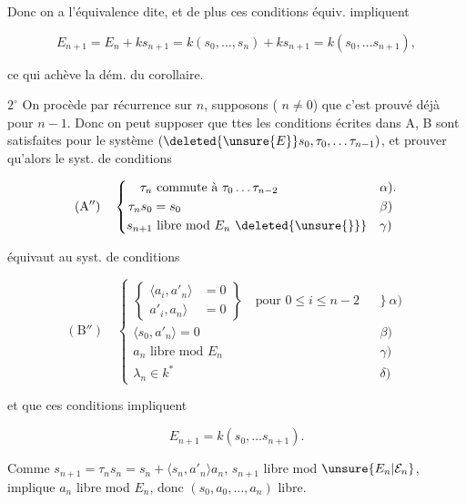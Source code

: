 Donc on a l'équivalence dite, et de plus ces  conditions équiv. impliquent

\[E_{n+1}=E_n+ks_{n+1}=k(s_0,\ldots,s_n)+ks_{n+1}=k(s_0,\ldots s_{n+1}),\]

ce qui achève la dém. du corollaire.

\textcircled{\scriptsize $2^\circ$} On procède par récurrence sur $n$, supposons ( $n\ne0$) que c'est prouvé déjà pour $n-1$. Donc on peut supposer que ttes les conditions écrites dans A, B sont satisfaites pour le système $(\deleted{\unsure{E}}s_0,\tau_0,\ldots\tau_{n-1})$,  et prouver qu'alors le syst. de conditions

\[(\mathrm A'')\quad\left\{\begin{aligned}\tau_n&\text{ commute à }\tau_0\ldots\tau_{n-2}&&\alpha).\\\tau_n s_0&=s_0 &&\beta)\\s_{n+1}&\text{ libre mod }E_n\ \deleted{\unsure{\}}}&&\gamma)\end{aligned}\right.\]

équivaut au syst. de conditions

\[(\mathrm B'')\quad\left\{\begin{aligned}\left\{\begin{aligned}\langle a_i,a'_n\rangle&=0\\ {}a'_i,a_n\rangle&=0\end{aligned}\right\}\quad\text{pour }0\leq i\leq n-2&&\big\}\ \alpha)\\ \langle s_0,a'_n\rangle=0&&\beta)\\ a_n\text{ libre mod }E_n&&\gamma)\\ \lambda_n\in k^*&&\delta)\end{aligned}\right.\]

et que ces conditions impliquent

\[E_{n+1}=k(s_0,\ldots s_{n+1}).\tag*{(20)}\]


Comme $s_{n+1}=\tau_n s_n=s_n+\langle s_n,a'_n\rangle a_n$,  $s_{n+1}$ libre mod $\unsure{E_n|\mathcal E_n}$, implique $a_n$ libre mod $E_n$, donc $(s_0,a_0,\ldots,a_n)$ libre.


